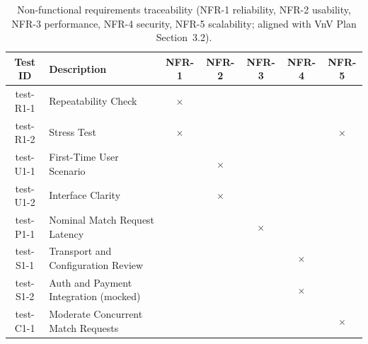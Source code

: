 \begin{table}[H]
\centering
\small
\begin{tabular}{|c|l|c|c|c|c|c|}
\hline
Test ID & Description & NFR-1 & NFR-2 & NFR-3 & NFR-4 & NFR-5 \\
\hline
test-R1-1 & Repeatability Check & $\times$ & & & & \\
test-R1-2 & Stress Test & $\times$ & & & & $\times$ \\
\hline
test-U1-1 & First-Time User Scenario & & $\times$ & & & \\
test-U1-2 & Interface Clarity & & $\times$ & & & \\
\hline
test-P1-1 & Nominal Match Request Latency & & & $\times$ & & \\
\hline
test-S1-1 & Transport and Configuration Review & & & & $\times$ & \\
test-S1-2 & Auth and Payment Integration (mocked) & & & & $\times$ & \\
\hline
test-C1-1 & Moderate Concurrent Match Requests & & & & & $\times$ \\
\hline
\end{tabular}
\caption{Non-functional requirements traceability (NFR-1 reliability, NFR-2 usability, NFR-3 performance, NFR-4 security, NFR-5 scalability; aligned with VnV Plan Section~3.2).}
\end{table}
